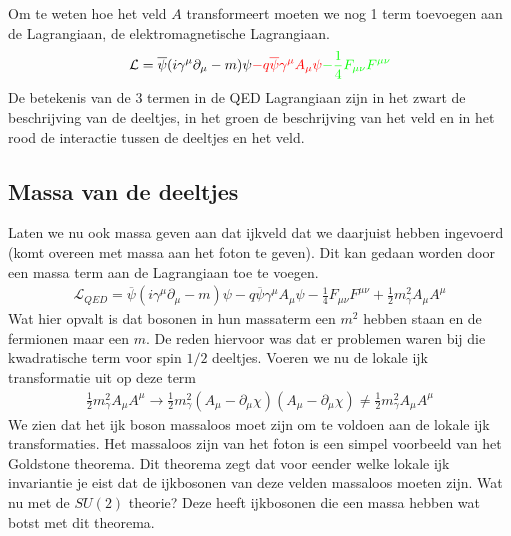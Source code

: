 \documentclass[../main.tex]{subfiles}
\begin{document}
Om te weten hoe het veld $A$ transformeert moeten we nog 1 term toevoegen aan de Lagrangiaan, de elektromagnetische Lagrangiaan.
\begin{equation}
    \begin{aligned}
        \label{eq:lok_ijk_inv_qed}
        \mathcal{L} = \overline \psi (i\gamma^\mu \partial_\mu - m)\psi {\color{red}- q\overline\psi\gamma^\mu A_\mu\psi} {\color{green}- \frac{1}{4} F_{\mu\nu}F^{\mu\nu}}
    \end{aligned}
\end{equation}
De betekenis van de 3 termen in de QED Lagrangiaan zijn in het zwart de beschrijving van de deeltjes, in het groen de beschrijving van het veld en in het rood de interactie tussen de deeltjes en het veld.

\subsection{Massa van de deeltjes}%
\label{sub:massa_van_de_deeltjes}

Laten we nu ook massa geven aan dat ijkveld dat we daarjuist hebben ingevoerd (komt overeen met massa aan het foton te geven). Dit kan gedaan worden door een massa term aan de Lagrangiaan toe te voegen.
\begin{equation}
    \begin{aligned}
        \label{eq:qed_lagr_met_massa}
        \mathcal{L}_{QED} = \overline \psi (i\gamma^\mu \partial_\mu - m)\psi - q\overline\psi\gamma^\mu A_\mu\psi - \frac{1}{4} F_{\mu\nu}F^{\mu\nu} + \frac{1}{2} m_\gamma^2 A_\mu A^\mu
    \end{aligned}
\end{equation}
Wat hier opvalt is dat bosonen in hun massaterm een $m^2$ hebben staan en de fermionen maar een $m$. De reden hiervoor was dat er problemen waren bij die kwadratische term voor spin $1/2$ deeltjes. Voeren we nu de lokale ijk transformatie uit op deze term
\begin{equation}
    \begin{aligned}
        \label{eq:lok_ijk_tran_massa_term}
        \frac{1}{2} m_\gamma^2A_\mu A^\mu \rightarrow \frac{1}{2} m_\gamma^2(A_\mu-\partial_\mu\chi)(A_\mu-\partial_\mu\chi) \neq \frac{1}{2} m_\gamma^2 A_\mu A^\mu
    \end{aligned}
\end{equation}
We zien dat het ijk boson massaloos moet zijn om te voldoen aan de lokale ijk transformaties. Het massaloos zijn van het foton is een simpel voorbeeld van het Goldstone theorema. Dit theorema zegt dat voor eender welke lokale ijk invariantie je eist dat de ijkbosonen van deze velden massaloos moeten zijn. Wat nu met de $SU(2)$ theorie? Deze heeft ijkbosonen die een massa hebben wat botst met dit theorema.
\end{document}

